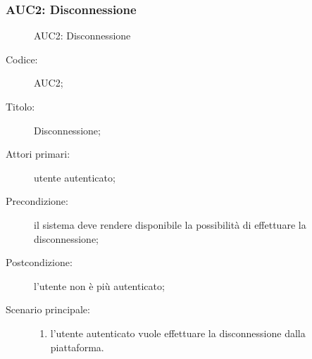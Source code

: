 \documentclass[../../../analisi-dei-requisiti.tex]{subfiles}
\begin{document}
\subsubsection{AUC2: Disconnessione}%
\label{subs:AUC2}

\begin{figure}[H]
  \centering
  \caption{AUC2: Disconnessione}%
  \label{fig:AUC2}
\end{figure}

\begin{description}
  \item[Codice:] AUC2;
  \item[Titolo:] Disconnessione;
  \item[Attori primari:] utente autenticato;
  \item[Precondizione:] il sistema deve rendere disponibile la possibilità di effettuare la disconnessione;
  \item[Postcondizione:] l'utente non è più autenticato;
  \item[Scenario principale:]
  \begin{enumerate}
    \item l'utente autenticato vuole effettuare la disconnessione dalla piattaforma.
  \end{enumerate}
\end{description}
\end{document}
